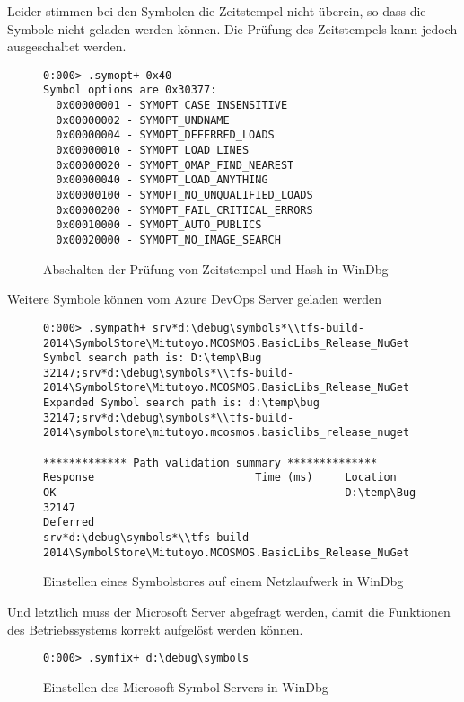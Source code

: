 Leider stimmen bei den Symbolen die Zeitstempel nicht überein, so dass die Symbole nicht geladen werden können.
Die Prüfung des Zeitstempels kann jedoch ausgeschaltet werden.
\begin{figure}[H]
\begin{lstlisting}[language=WinDbg]
0:000> .symopt+ 0x40
Symbol options are 0x30377:
  0x00000001 - SYMOPT_CASE_INSENSITIVE
  0x00000002 - SYMOPT_UNDNAME
  0x00000004 - SYMOPT_DEFERRED_LOADS
  0x00000010 - SYMOPT_LOAD_LINES
  0x00000020 - SYMOPT_OMAP_FIND_NEAREST
  0x00000040 - SYMOPT_LOAD_ANYTHING
  0x00000100 - SYMOPT_NO_UNQUALIFIED_LOADS
  0x00000200 - SYMOPT_FAIL_CRITICAL_ERRORS
  0x00010000 - SYMOPT_AUTO_PUBLICS
  0x00020000 - SYMOPT_NO_IMAGE_SEARCH
\end{lstlisting}
\caption{Abschalten der Prüfung von Zeitstempel und Hash in WinDbg}
\end{figure}

Weitere Symbole können vom Azure DevOps Server geladen werden
\begin{figure}[H]
\begin{lstlisting}[language=WinDbg]
0:000> .sympath+ srv*d:\debug\symbols*\\tfs-build-2014\SymbolStore\Mitutoyo.MCOSMOS.BasicLibs_Release_NuGet
Symbol search path is: D:\temp\Bug 32147;srv*d:\debug\symbols*\\tfs-build-2014\SymbolStore\Mitutoyo.MCOSMOS.BasicLibs_Release_NuGet
Expanded Symbol search path is: d:\temp\bug 32147;srv*d:\debug\symbols*\\tfs-build-2014\symbolstore\mitutoyo.mcosmos.basiclibs_release_nuget

************* Path validation summary **************
Response                         Time (ms)     Location
OK                                             D:\temp\Bug 32147
Deferred                                       srv*d:\debug\symbols*\\tfs-build-2014\SymbolStore\Mitutoyo.MCOSMOS.BasicLibs_Release_NuGet
\end{lstlisting}
\caption{Einstellen eines Symbolstores auf einem Netzlaufwerk in WinDbg}
\end{figure}

Und letztlich muss der Microsoft Server abgefragt werden, damit die Funktionen des Betriebssystems korrekt aufgelöst werden können.
\begin{figure}[H]
\begin{lstlisting}[language=WinDbg]
0:000> .symfix+ d:\debug\symbols
\end{lstlisting}
\caption{Einstellen des Microsoft Symbol Servers in WinDbg}
\end{figure}


